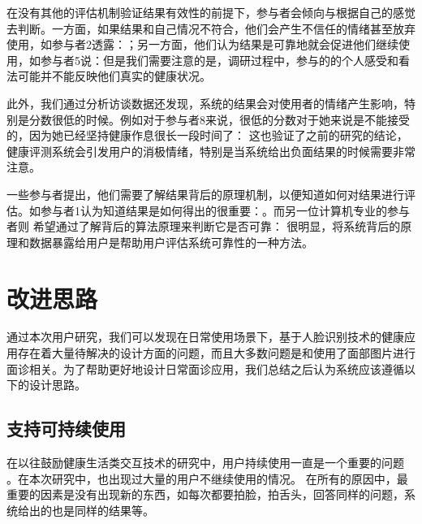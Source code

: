在没有其他的评估机制验证结果有效性的前提下，参与者会倾向与根据自己的感觉去判断。一方面，如果结果和自己情况不符合，他们会产生不信任的情绪甚至放弃使用，如参与者2透露：；另一方面，他们认为结果是可靠地就会促进他们继续使用，如参与者5说：但是我们需要注意的是，调研过程中，参与的的个人感受和看法可能并不能反映他们真实的健康状况。

此外，我们通过分析访谈数据还发现，系统的结果会对使用者的情绪产生影响，特别是分数很低的时候。例如对于参与者8来说，很低的分数对于她来说是不能接受的，因为她已经坚持健康作息很长一段时间了： 这也验证了之前的研究\cite{Toscos2013Designing}的结论，健康评测系统会引发用户的消极情绪，特别是当系统给出负面结果的时候需要非常注意。

一些参与者提出，他们需要了解结果背后的原理机制，以便知道如何对结果进行评估。如参与者1认为知道结果是如何得出的很重要：。而另一位计算机专业的参与者则
希望通过了解背后的算法原理来判断它是否可靠： 很明显，将系统背后的原理和数据暴露给用户是帮助用户评估系统可靠性的一种方法。

\section{改进思路}

通过本次用户研究，我们可以发现在日常使用场景下，基于人脸识别技术的健康应用存在着大量待解决的设计方面的问题，而且大多数问题是和使用了面部图片进行面诊相关。为了帮助更好地设计日常面诊应用，我们总结之后认为系统应该遵循以下的设计思路。

\subsection{支持可持续使用}
在以往鼓励健康生活类交互技术的研究中，用户持续使用一直是一个重要的问题\cite{Clawson2015No} \cite{Epstein2016Beyond}。在本次研究中，也出现过大量的用户不继续使用的情况。
在所有的原因中，最重要的因素是没有出现新的东西，如每次都要拍脸，拍舌头，回答同样的问题，系统给出的也是同样的结果等。

